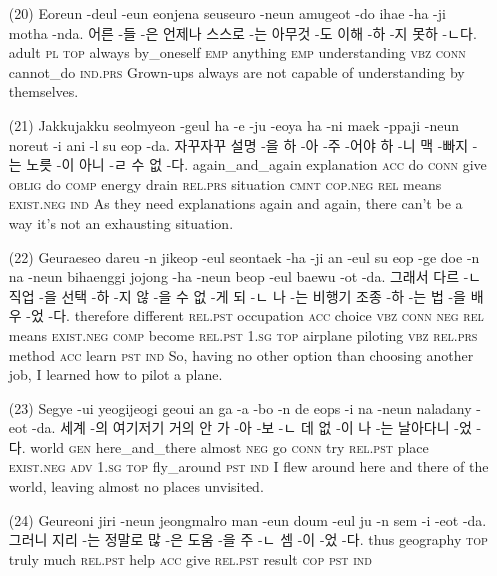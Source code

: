 \begin{itemize}
\item [(20)]
\tgl
		{Eoreun -deul -eun eonjena seuseuro -neun amugeot -do ihae -ha -ji motha -nda.}
		{어른 -들 -은 언제나 스스로 -는 아무것 -도 이해 -하 -지 못하 -ㄴ다.}
		{adult	\textsc{pl}	\textsc{top}	always	by\_oneself	\textsc{emp}	anything	\textsc{emp}	understanding	\textsc{vbz}	\textsc{conn}	cannot\_do	\textsc{ind.prs}}
		{Grown-ups always are not capable of understanding by themselves.}

\item [(21)]
\tgl
		{Jakkujakku seolmyeon -geul ha -e -ju -eoya ha -ni maek -ppaji -neun noreut -i ani -l su eop -da.}
		{자꾸자꾸 설명 -을 하 -아 -주 -어야 하 -니 맥 -빠지 -는 노릇 -이 아니 -ㄹ 수 없 -다.}
		{again\_and\_again	explanation	\textsc{acc}	do	\textsc{conn}	give	\textsc{oblig}	do	\textsc{comp}	energy	drain	\textsc{rel.prs}	situation	\textsc{cmnt}	\textsc{cop.neg}	\textsc{rel}	means	\textsc{exist.neg}	\textsc{ind}}
		{As they need explanations again and again, there can't be a way it's not an exhausting situation.}

\item [(22)]
\tgl
		{Geuraeseo dareu -n jikeop -eul seontaek -ha -ji an -eul su eop -ge doe -n na -neun bihaenggi jojong -ha -neun beop -eul baewu -ot -da.}
		{그래서 다르 -ㄴ 직업 -을 선택 -하 -지 않 -을 수 없 -게 되 -ㄴ 나 -는 비행기 조종 -하 -는 법 -을 배우 -었 -다.}
		{therefore	different	\textsc{rel.pst}	occupation	\textsc{acc}	choice	\textsc{vbz}	\textsc{conn}	\textsc{neg}	\textsc{rel}	means	\textsc{exist.neg}	\textsc{comp}	become	\textsc{rel.pst}	\textsc{1.sg}	\textsc{top}	airplane	piloting	\textsc{vbz}	\textsc{rel.prs}	method	\textsc{acc}	learn	\textsc{pst} \textsc{ind}}
		{So, having no other option than choosing another job, I learned how to pilot a plane.}

\item [(23)]
\tgl
		{Segye -ui yeogijeogi geoui an ga -a -bo -n de eops -i na -neun naladany -eot -da.}
		{세계 -의 여기저기 거의 안 가 -아 -보 -ㄴ 데 없 -이 나 -는 날아다니 -었 -다.}
		{world	\textsc{gen}	here\_and\_there	almost	\textsc{neg}	go	\textsc{conn}	try	\textsc{rel.pst}	place	\textsc{exist.neg}	\textsc{adv}	\textsc{1.sg}	\textsc{top}	fly\_around	\textsc{pst} \textsc{ind}}
		{I flew around here and there of the world, leaving almost no places unvisited.}

\item [(24)]
\tgl
		{Geureoni jiri -neun jeongmalro man -eun doum -eul ju -n sem -i -eot -da.}
		{그러니 지리 -는 정말로 많 -은 도움 -을 주 -ㄴ 셈 -이 -었 -다.}
		{thus	geography	\textsc{top}	truly	much	\textsc{rel.pst}	help	\textsc{acc}	give	\textsc{rel.pst}	result	\textsc{cop}	\textsc{pst}	\textsc{ind}}
		{}


\end{itemize}
